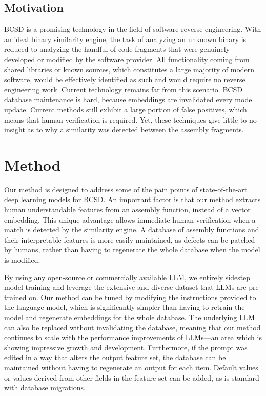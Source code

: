 \subsection{Motivation}

BCSD is a promising technology in the field of software reverse engineering. With an ideal binary similarity engine,
the task of analyzing an unknown binary is reduced to analyzing the handful of code fragments that were genuinely developed
or modified by the software provider. All functionality coming from shared libraries or known sources, which constitutes a
large majority of modern software, would be effectively identified as such and would require no reverse engineering work.
Current technology remains far from this scenario. BCSD database maintenance is hard, because embeddings are invalidated
every model update. Current methods still exhibit a large portion of false positives, which means that human verification
is required. Yet, these techniques give little to no insight as to why a similarity was detected between the assembly fragments.

\section{Method}

Our method is designed to address some of the pain points of state-of-the-art deep learning models for BCSD.
An important factor is that our method extracts human understandable features from an assembly function, instead
of a vector embedding. This unique advantage allows immediate human verification when a match is detected by the similarity
engine. A database of assembly functions and their interpretable features is more easily maintained, as defects can
be patched by humans, rather than having to regenerate the whole database when the model is modified.

By using any open-source or commercially available LLM, we entirely sidestep model training and leverage the extensive
and diverse dataset that LLMs are pre-trained on. Our method can be tuned by modifying the instructions provided to
the language model, which is significantly simpler than having to retrain the model and regenerate embeddings for the whole database.
The underlying LLM can also be replaced without invalidating the database, meaning that our method continues
to scale with the performance improvements of LLMs---an area which is showing impressive growth and development. Furthermore, if
the prompt was edited in a way that alters the output feature set, the database can be maintained without
having to regenerate an output for each item. Default values or values derived from other fields in the feature set can be added,
as is standard with database migrations.


